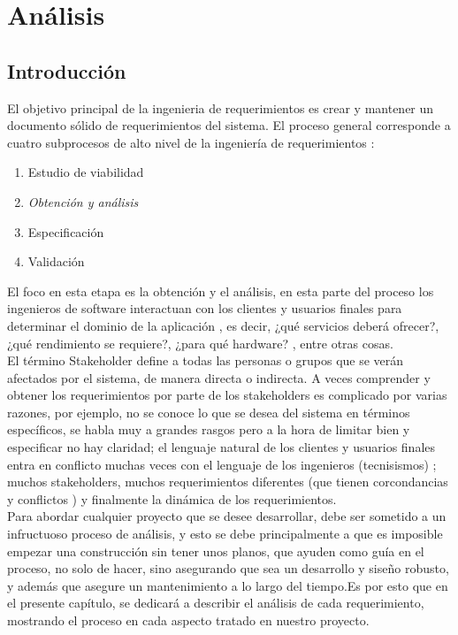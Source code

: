 \chapter{Análisis}

\section{Introducción}
El objetivo principal de la ingenieria de requerimientos es crear y mantener un documento sólido de requerimientos del sistema. El proceso general corresponde a cuatro subprocesos de alto nivel de la ingeniería de requerimientos :

\begin{enumerate}
	\item Estudio de viabilidad
	\item \emph{Obtención y análisis}
	\item Especificación
	\item Validación 
\end{enumerate} 

El foco en esta etapa es la obtención y el análisis, en esta parte del proceso los ingenieros de software interactuan con los clientes y usuarios finales para determinar el dominio de la aplicación , es decir, ¿qué servicios deberá ofrecer?, ¿qué rendimiento se requiere?, ¿para qué hardware? , entre otras cosas. \cite{sommerville2005ingenieria}\\

El término Stakeholder define a todas las personas o grupos que se verán afectados por el sistema, de manera directa o indirecta. A veces comprender y obtener los requerimientos por parte de los stakeholders es complicado por varias razones, por ejemplo, no se conoce lo que se desea del sistema en términos específicos, se habla muy a grandes rasgos pero a la hora de limitar bien y especificar no hay claridad; el lenguaje natural de los clientes y usuarios finales entra en conflicto muchas veces con el lenguaje de los ingenieros (tecnisismos) ; muchos stakeholders, muchos requerimientos diferentes (que tienen corcondancias y conflictos ) y finalmente la dinámica de los requerimientos.\\

Para abordar cualquier proyecto que se desee desarrollar, debe ser sometido a un infructuoso proceso de análisis, y esto se debe principalmente a que es imposible empezar una construcción sin tener unos planos, que ayuden como guía en el proceso, no solo de hacer, sino asegurando que sea un desarrollo y siseño robusto, y además que asegure un mantenimiento a lo largo del tiempo.Es por esto que en el presente capítulo, se dedicará a describir el análisis de cada requerimiento, mostrando el proceso en cada aspecto tratado en nuestro proyecto.



